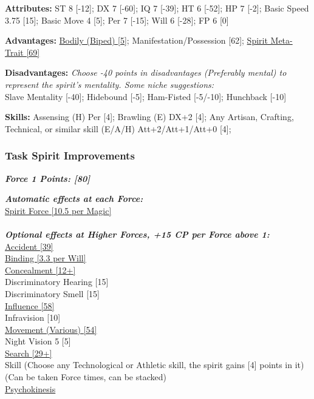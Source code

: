 \begin{multicols}{3}
	\textbf{Attributes:}
	ST 8 [-12]; DX 7 [-60]; IQ 7 [-39]; HT 6 [-52]; HP 7 [-2]; Basic Speed 3.75 [15]; Basic Move 4 [5]; Per 7 [-15]; Will 6 [-28]; FP 6 [0]
	
	\textbf{Advantages:}
	\hyperref[bodily]{Bodily (Biped) [5]}; Manifestation/Possession [62]; \hyperref[spirit_meta_trait]{Spirit Meta-Trait [69]}
	
	\textbf{Disadvantages:}
	\textit{Choose -40 points in disadvantages (Preferably mental) to represent the spirit's mentality. Some niche suggestions:\\}
	Slave Mentality [-40]; Hidebound [-5]; Ham-Fisted [-5/-10]; Hunchback [-10]
	
	\textbf{Skills:}
	Assensing (H) Per [4]; Brawling (E) DX+2 [4]; Any Artisan, Crafting, Technical, or similar skill (E/A/H) Att+2/Att+1/Att+0 [4];
	
	\subsubsection*{Task Spirit Improvements}
	
	\textbf{\textit{Force 1 Points: [80]}}
	
	\textbf{\textit{Automatic effects at each Force:\\}}
	\hyperref[spirit_force]{Spirit Force [10.5 per Magic]}\\\\
	
	\textbf{\textit{Optional effects at Higher Forces, +15 CP per Force above 1:\\}}
	\hyperref[accident]{Accident [39]}\\
	\hyperref[binding]{Binding [3.3 per Will]}\\
	\hyperref[concealment]{Concealment [12+]}\\
	Discriminatory Hearing [15] \\
	Discriminatory Smell [15] \\
	\hyperref[influence]{Influence [58]}\\
	Infravision [10] \\
	\hyperref[movement]{Movement (Various) [54]}\\
	Night Vision 5 [5] \\
	\hyperref[search]{Search [29+]}\\
	Skill (Choose any Technological or Athletic skill, the spirit gains [4] points in it) (Can be taken Force times, can be stacked)\\
	\hyperref[psychokinesis]{Psychokinesis}\\
	
\end{multicols}